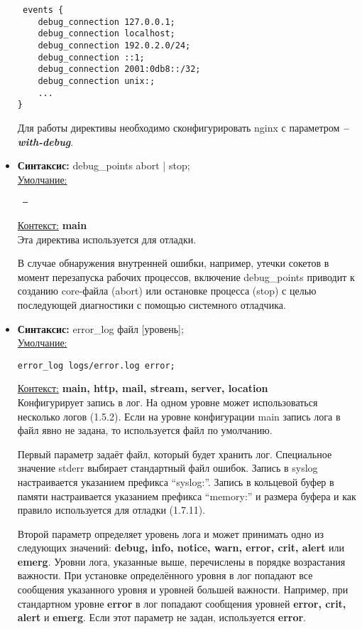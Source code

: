 \documentclass[a4paper,10pt,twoside]{article}
\begin{document}
\begin{itemize}
\begin{verbatim}
 events {
    debug_connection 127.0.0.1;
    debug_connection localhost;
    debug_connection 192.0.2.0/24;
    debug_connection ::1;
    debug_connection 2001:0db8::/32;
    debug_connection unix:;
    ...
}
\end{verbatim} 
Для работы директивы необходимо сконфигурировать nginx с параметром \textit{\textbf{--with-debug}}.

\item \textbf{Синтаксис:} debug\_points abort | stop;\\
\underline{Умолчание:}
\begin{verbatim}
 —
\end{verbatim} 
\underline{Контекст:} \textbf{main}\\
Эта директива используется для отладки.

В случае обнаружения внутренней ошибки, например, утечки сокетов в момент перезапуска рабочих процессов, включение debug\_points приводит к созданию core-файла (abort) или остановке процесса (stop) с целью последующей диагностики с помощью системного отладчика.

\item \textbf{Синтаксис:} error\_log файл [уровень];\\
\underline{Умолчание:}
\begin{verbatim}
error_log logs/error.log error;
\end{verbatim} 
\underline{Контекст:} \textbf{main, http, mail, stream, server, location}\\
Конфигурирует запись в лог. На одном уровне может использоваться несколько логов (1.5.2). Если на уровне конфигурации main запись лога в файл явно не задана, то используется файл по умолчанию.

Первый параметр задаёт файл, который будет хранить лог. Специальное значение stderr выбирает стандартный файл ошибок. Запись в syslog настраивается указанием префикса “syslog:”. Запись в кольцевой буфер в памяти настраивается указанием префикса “memory:” и размера буфера и как правило используется для отладки (1.7.11).

Второй параметр определяет уровень лога и может принимать одно из следующих значений: \textbf{debug, info, notice, warn, error, crit, alert} или \textbf{emerg}. Уровни лога, указанные выше, перечислены в порядке возрастания важности. При установке определённого уровня в лог попадают все сообщения указанного уровня и уровней большей важности. Например, при стандартном уровне \textbf{error} в лог попадают сообщения уровней \textbf{error, crit, alert} и \textbf{emerg}. Если этот параметр не задан, используется \textbf{error}.


\end{itemize}
\end{document}
